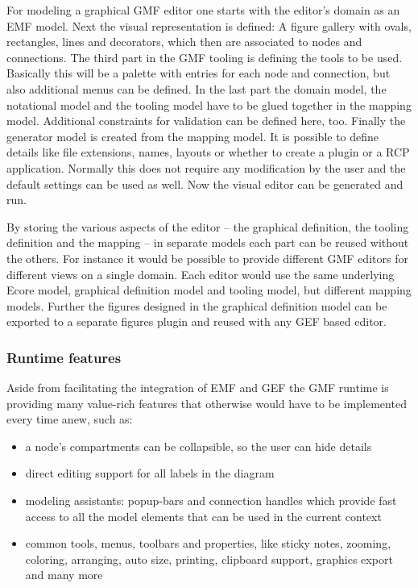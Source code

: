 For modeling a graphical GMF editor one starts with the editor's domain as an EMF model. Next the visual representation is defined: A figure gallery with ovals, rectangles, lines and decorators, which then are associated to nodes and connections. The third part in the GMF tooling is defining the tools to be used. Basically this will be a palette with entries for each node and connection, but also  additional menus can be defined. In the last part the domain model, the notational model and the tooling model have to be glued together in the mapping model. Additional constraints for validation can be defined here, too. Finally the generator model is created from the mapping model. It is possible to define details like file extensions, names, layouts or whether to create a plugin or a RCP application. Normally this does not require any modification by the user and the default settings can be used as well. Now the visual editor can be generated and run.

By storing the various aspects of the editor -- the graphical definition, the tooling definition and the mapping -- in separate models each part can be reused without the others. For instance it would be possible to provide different GMF editors for different views on a single domain. Each editor would use the same underlying Ecore model, graphical definition model and tooling model, but different mapping models. Further the figures designed in the graphical definition model can be exported to a separate figures plugin and reused with any GEF based editor.

\subsubsection*{Runtime features}
Aside from facilitating the integration of EMF and GEF the GMF runtime is providing many value-rich features that otherwise would have to be implemented every time anew, such as:

\begin{itemize}
	\item a node's compartments can be collapsible, so the user can hide details
	\item direct editing support for all labels in the diagram
	\item modeling assistants: popup-bars and connection handles which provide fast access to all the model elements that can be used in the current context
	\item common tools, menus, toolbars and properties, like sticky notes, zooming, coloring, arranging, auto size, printing, clipboard support, graphics export and many more
\end{itemize}

